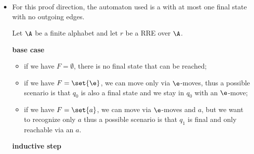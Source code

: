 \documentclass[oneside]{academica}
\begin{document}
\begin{proof*}
  \begin{itemize}
    \item[\color{pink!200}$\Leftarrow$] For this proof direction, the automaton used is a \eNFA with at most one final state with no outgoing edges.

    Let $\A$ be a finite alphabet and let $r$ be a RRE over $\A$.

    \textbf{base case}
    \begin{itemize}
      \item if we have $F = \emptyset$, there is no final state that can be reached;
      \item if we have $F = \set{\e}$, we can move only via $\e$-moves, thus a possible scenario is that $q_0$ is also a final state and we stay in $q_0$ with an $\e$-move;
      \item if we have $F = \set{a}$, we can move via $\e$-moves and $a$, but we want to recognize only $a$ thus a possible scenario is that $q_1$ is final and only reachable via an $a$.
    \end{itemize}

    \textbf{inductive step}
\end{itemize}
\end{proof*}
\end{document}
